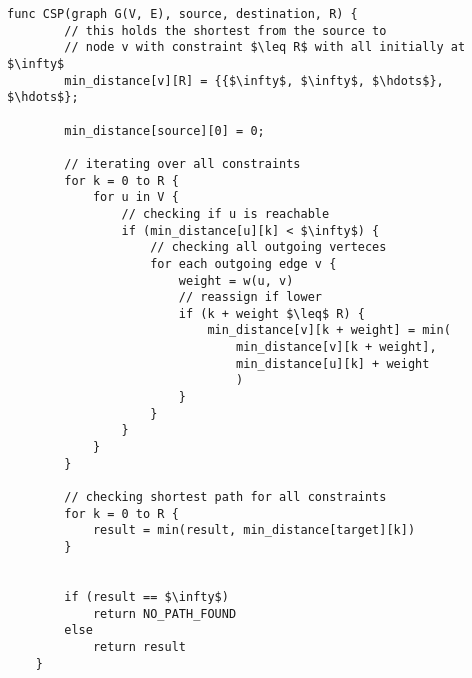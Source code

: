 \begin{lstlisting}[mathescape=true]
    func CSP(graph G(V, E), source, destination, R) {
        // this holds the shortest from the source to
        // node v with constraint $\leq R$ with all initially at $\infty$
        min_distance[v][R] = {{$\infty$, $\infty$, $\hdots$}, $\hdots$};

        min_distance[source][0] = 0;

        // iterating over all constraints
        for k = 0 to R {
            for u in V {
                // checking if u is reachable
                if (min_distance[u][k] < $\infty$) {
                    // checking all outgoing verteces
                    for each outgoing edge v {
                        weight = w(u, v)
                        // reassign if lower
                        if (k + weight $\leq$ R) {
                            min_distance[v][k + weight] = min(
                                min_distance[v][k + weight],
                                min_distance[u][k] + weight
                                )
                        }
                    }
                }
            }
        }

        // checking shortest path for all constraints
        for k = 0 to R {
            result = min(result, min_distance[target][k])
        }


        if (result == $\infty$)
            return NO_PATH_FOUND
        else
            return result
    }
\end{lstlisting}